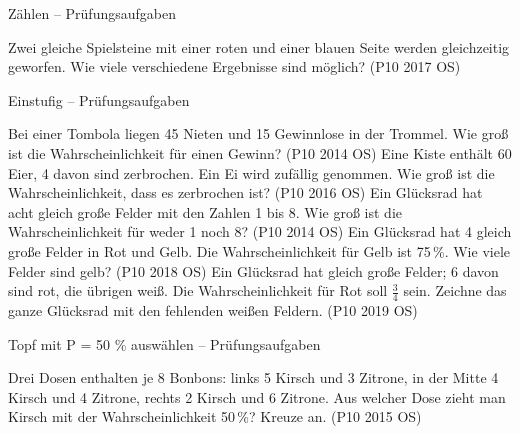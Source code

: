 \setcounter{aufgabe}{5}

\begin{aufgabe}{Zählen – Prüfungsaufgaben}
\begin{teile}
\teil Zwei gleiche Spielsteine mit einer roten und einer blauen Seite werden gleichzeitig geworfen. Wie viele verschiedene Ergebnisse sind möglich? \hfill (P10 2017 OS)
\end{teile}
\end{aufgabe}

\begin{aufgabe}{Einstufig – Prüfungsaufgaben}
\begin{teile}
\teil Bei einer Tombola liegen 45 Nieten und 15 Gewinnlose in der Trommel. Wie groß ist die Wahrscheinlichkeit für einen Gewinn? \hfill (P10 2014 OS)
\teil Eine Kiste enthält 60 Eier, 4 davon sind zerbrochen. Ein Ei wird zufällig genommen. Wie groß ist die Wahrscheinlichkeit, dass es zerbrochen ist? \hfill (P10 2016 OS)
\teil Ein Glücksrad hat acht gleich große Felder mit den Zahlen 1 bis 8. Wie groß ist die Wahrscheinlichkeit für weder 1 noch 8? \hfill (P10 2014 OS)
\teil Ein Glücksrad hat 4 gleich große Felder in Rot und Gelb. Die Wahrscheinlichkeit für Gelb ist 75\,\%. Wie viele Felder sind gelb? \hfill (P10 2018 OS)
\teil Ein Glücksrad hat gleich große Felder; 6 davon sind rot, die übrigen weiß. Die Wahrscheinlichkeit für Rot soll $\frac{3}{4}$ sein. Zeichne das ganze Glücksrad mit den fehlenden weißen Feldern. \hfill (P10 2019 OS)

\kreisleer[2]
\end{teile}
\end{aufgabe}

\begin{aufgabe}{Topf mit P = 50 \% auswählen – Prüfungsaufgaben}
\begin{teile}
\teil Drei Dosen enthalten je 8 Bonbons: links 5 Kirsch und 3 Zitrone, in der Mitte 4 Kirsch und 4 Zitrone, rechts 2 Kirsch und 6 Zitrone. Aus welcher Dose zieht man Kirsch mit der Wahrscheinlichkeit 50\,\%? Kreuze an. \hfill (P10 2015 OS) \\  \\  \\ 
\end{teile}
\end{aufgabe}
